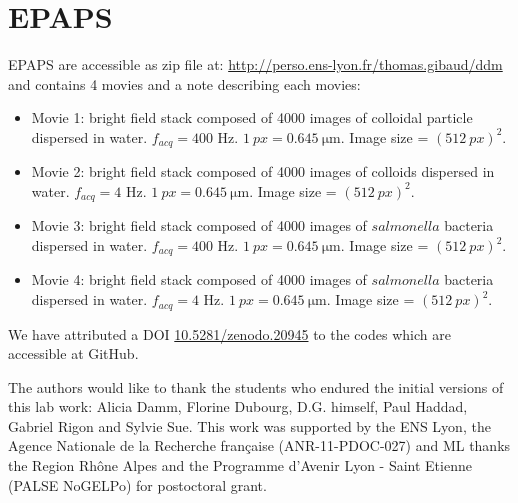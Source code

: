 \documentclass[prb,reprint,amsmath,amssymb]{revtex4-1}
\begin{document}
\section*{\label{epaps}EPAPS}
EPAPS are accessible as zip file at: \url{http://perso.ens-lyon.fr/thomas.gibaud/ddm} and  contains 4 movies and a note describing each movies:
\begin{itemize}
 \item Movie 1: bright field stack composed of 4000 images of colloidal particle dispersed in water. $f_{acq}=400$ Hz. $\SI{1}{px} = \SI{0.645}{\micro\meter}$. Image size = $(\SI{512}{px})^2$.
 \item Movie 2: bright field stack composed of 4000 images of colloids dispersed in water. $f_{acq}=4$ Hz. $\SI{1}{px} = \SI{0.645}{\micro\meter}$. Image size = $(\SI{512}{px})^2$.
 \item Movie 3: bright field stack composed of 4000 images of $salmonella$ bacteria dispersed in water. $f_{acq}=400$ Hz. $\SI{1}{px} = \SI{0.645}{\micro\meter}$. Image size = $(\SI{512}{px})^2$.
 \item Movie 4: bright field stack composed of 4000 images of $salmonella$ bacteria dispersed in water. $f_{acq}=4$ Hz. $\SI{1}{px} = \SI{0.645}{\micro\meter}$. Image size = $(\SI{512}{px})^2$.
\end{itemize}

We have attributed a DOI \href{http://dx.doi.org/10.5281/zenodo.20945}{10.5281/zenodo.20945}\cite{code_github} to the codes which are accessible at GitHub.


\begin{acknowledgments}
The authors would like to thank the students who endured the initial versions of this lab work: Alicia Damm, Florine Dubourg, D.G. himself, Paul Haddad, Gabriel Rigon and Sylvie Sue. 
This work was supported by the ENS Lyon, the Agence Nationale de la Recherche fran\c{c}aise (ANR-11-PDOC-027) and ML thanks the Region Rh\^one Alpes and
the Programme d'Avenir Lyon - Saint Etienne (PALSE NoGELPo) for postoctoral grant.
\end{acknowledgments}



\end{document}
